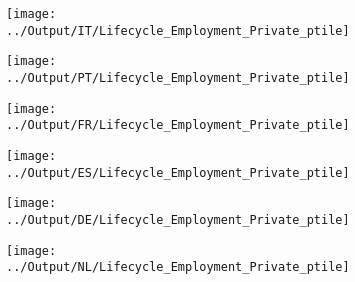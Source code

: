 \documentclass[12pt,notitlepage]{article}
\begin{document}
\begin{figure}[!htpb]
\centering
\caption{Employment Percentiles by Year (Private Firms)}
\begin{subfigure}{.49\textwidth}
    \centering
 \texttt{[image: ../Output/IT/Lifecycle\_Employment\_Private\_ptile]}
\end{subfigure}%
\begin{subfigure}{.49\textwidth}
    \centering
 \texttt{[image: ../Output/PT/Lifecycle\_Employment\_Private\_ptile]}
\end{subfigure}
\begin{subfigure}{.49\textwidth}
    \centering
 \texttt{[image: ../Output/FR/Lifecycle\_Employment\_Private\_ptile]}
\end{subfigure}%
\begin{subfigure}{.49\textwidth}
    \centering
 \texttt{[image: ../Output/ES/Lifecycle\_Employment\_Private\_ptile]}
\end{subfigure}
\begin{subfigure}{.49\textwidth}
    \centering
 \texttt{[image: ../Output/DE/Lifecycle\_Employment\_Private\_ptile]}
\end{subfigure}
\begin{subfigure}{.49\textwidth}
    \centering
 \texttt{[image: ../Output/NL/Lifecycle\_Employment\_Private\_ptile]}
\end{subfigure}
\end{figure}
\pagebreak
\end{document}
